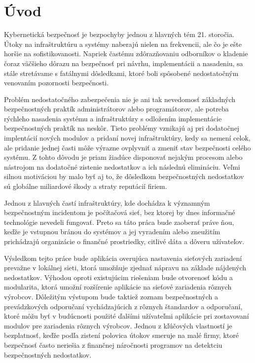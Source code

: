 \chapter*{Úvod}
{}



%

Kybernetická bezpečnosť je bezpochyby jednou z hlavných tém 21. storočia. Útoky na infraštruktúru a systémy naberajú nielen na frekvencii, ale čo je ešte horšie na sofistikovanosti. Napriek častému zdôrazňovaniu odborníkov o kladenie čoraz väčšieho dôrazu na bezpečnosť pri návrhu, implementácii a nasadeniu, sa stále stretávame s fatálnymi dôsledkami, ktoré boli spôsobené nedostatočným venovaním pozornosti bezpečnosti. 

Problém nedostatočného zabezpečenia nie je ani tak nevedomosť základných bezpečnostných praktík administrátorov alebo programátorov, ale potreba rýchleho nasadenia systému a infraštruktúry s odložením implementácie bezpečnostných praktík na neskôr. Tieto problémy vznikajú aj pri dodatočnej implentácií nových modulov a pridaní novej infraštruktúry, kedy sa nemení celok, ale pridanie jednej časti môže výrazne ovplyvniť a zmeniť stav bezpečnosti celého systému. Z tohto dôvodu je priam žiadúce disponovať nejakým procesom alebo nástrojom na dodatočné zistenie nedostatkov a ich následnú elimináciu. Veľmi silnou motiváciou by malo byť aj to, že dôsledkom bezpečnostných nedostatkov sú globálne miliardové škody a straty reputácií firiem. 

Jednou z hlavných častí infraštruktúry, kde dochádza k významným bezpečnostným incidentom je počítačová sieť, bez ktorej by dnes informačné technológie nevedeli fungovať. Preto sa táto práca bude zaoberať práve ňou, keďže je vstupnou bránou do systémov a jej vyradením alebo zneužitím prichádzajú organizácie o finančné prostriedky, citlivé dáta a dôveru užívateľov.

Výsledkom tejto práce bude aplikácia overujúca nastavenia sieťových zariadení prevažne v lokálnej sieti, ktorá umožňuje zjednať nápravu na základe nájdených nedostatkov. Výhodou oproti existujúcim riešeniam bude otvorenosť kódu a modularita, ktorá umožní rozšírenie aplikácie na sieťové zariadenia rôznych výrobcov. Dôležitým výstupom bude taktiež zoznam bezpečnostných a prevádzkových odporučaní vychádzajúcich z rôznych štandardov a odporučaní, ktoré môžu byť v budúcnosti použité ďalšími užívateľmi aplikácie pri zostavovaní modulov pre zariadenia rôznych výrobcov. Jednou z kľúčových vlastností je bezplatnosť, keďže podľa zistení polovica útokov smeruje na malé firmy, ktoré bezpečnosť často neriešia z finančnej náročnosti programov na detektciu bezpečnostných nedostatkov.    
